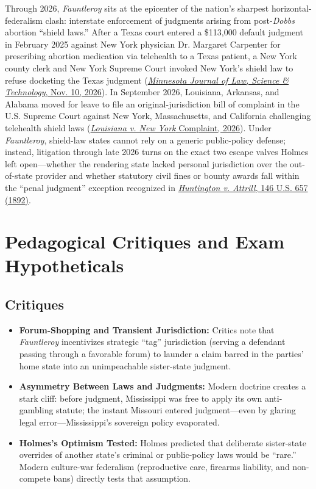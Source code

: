 \documentclass[12pt]{article}
\begin{document}
Through 2026, \textit{Fauntleroy} sits at the epicenter of the nation's sharpest horizontal-federalism clash: interstate enforcement of judgments arising from post-\textit{Dobbs} abortion ``shield laws.'' After a Texas court entered a \$113,000 default judgment in February 2025 against New York physician Dr. Margaret Carpenter for prescribing abortion medication via telehealth to a Texas patient, a New York county clerk and New York Supreme Court invoked New York's shield law to refuse docketing the Texas judgment (\href{https://journals.law.umn.edu/mjlst/2026/11/10/telehealth-abortion-and-the-limits-of-state-shield-laws}{\textit{Minnesota Journal of Law, Science \& Technology}, Nov. 10, 2026}). In September 2026, Louisiana, Arkansas, and Alabama moved for leave to file an original-jurisdiction bill of complaint in the U.S. Supreme Court against New York, Massachusetts, and California challenging telehealth shield laws (\href{https://www.ag.state.la.us/Files/Article/637/Documents/asfiledLouisianav.NewYork-Complaint.pdf}{\textit{Louisiana v. New York} Complaint, 2026}). Under \textit{Fauntleroy}, shield-law states cannot rely on a generic public-policy defense; instead, litigation through late 2026 turns on the exact two escape valves Holmes left open---whether the rendering state lacked personal jurisdiction over the out-of-state provider and whether statutory civil fines or bounty awards fall within the ``penal judgment'' exception recognized in \href{https://supreme.justia.com/cases/federal/us/146/657/}{\textit{Huntington v. Attrill}, 146 U.S. 657 (1892)}.

\section{Pedagogical Critiques and Exam Hypotheticals}

\subsection{Critiques}
\begin{itemize}
    \item \textbf{Forum-Shopping and Transient Jurisdiction:} Critics note that \textit{Fauntleroy} incentivizes strategic ``tag'' jurisdiction (serving a defendant passing through a favorable forum) to launder a claim barred in the parties' home state into an unimpeachable sister-state judgment.
    \item \textbf{Asymmetry Between Laws and Judgments:} Modern doctrine creates a stark cliff: before judgment, Mississippi was free to apply its own anti-gambling statute; the instant Missouri entered judgment---even by glaring legal error---Mississippi's sovereign policy evaporated.
    \item \textbf{Holmes's Optimism Tested:} Holmes predicted that deliberate sister-state overrides of another state's criminal or public-policy laws would be ``rare.'' Modern culture-war federalism (reproductive care, firearms liability, and non-compete bans) directly tests that assumption.
\end{itemize}
\end{document}
